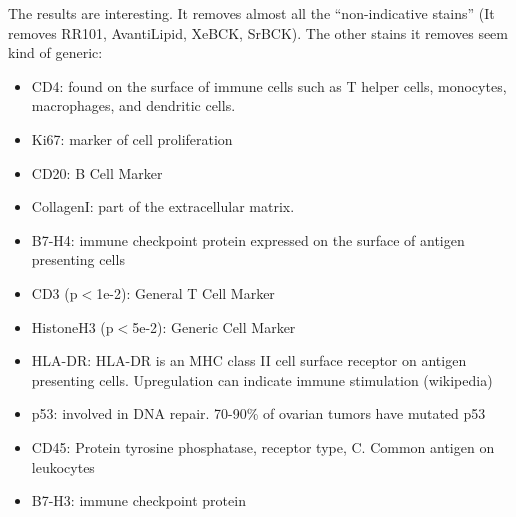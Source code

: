 \documentclass[a4paper]{article}\usepackage[]{graphicx}\usepackage[]{color}
\begin{document}
The results are interesting. It removes almost all the ``non-indicative stains'' (It removes RR101, AvantiLipid, XeBCK, SrBCK). The other stains it removes seem kind of generic:
\begin{itemize}
  \item CD4: found on the surface of immune cells such as T helper cells, monocytes, macrophages, and dendritic cells.
  \item Ki67: marker of cell proliferation
  \item CD20: B Cell Marker
  \item CollagenI: part of the extracellular matrix.
  \item B7-H4: immune checkpoint protein expressed on the surface of antigen presenting cells
  \item CD3 (p$<$1e-2): General T Cell Marker
  \item HistoneH3 (p$<$5e-2): Generic Cell Marker
  \item HLA-DR: HLA-DR is an MHC class II cell surface receptor on antigen presenting cells. Upregulation can indicate immune stimulation (wikipedia)
  \item p53: involved in DNA repair. 70-90\% of ovarian tumors have mutated p53
  \item CD45: Protein tyrosine phosphatase, receptor type, C. Common antigen on leukocytes
  \item B7-H3: immune checkpoint protein
\end{itemize}
\end{document}
